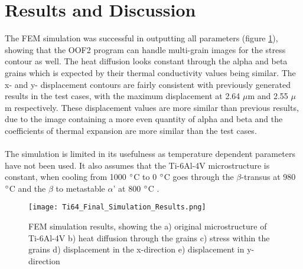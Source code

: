 \documentclass[report.tex]{subfiles}
\begin{document}
\section{Results and Discussion}

The FEM simulation was successful in outputting all parameters (figure \ref{fig:FinalSimulationResults}), showing that the OOF2 program can handle multi-grain images for the stress contour as well. The heat diffusion looks constant through the alpha and beta grains which is expected by their thermal conductivity values being similar. The x- and y- displacement contours are fairly consistent with previously generated results in the test cases, with the maximum displacement at 2.64 $\mu$m and 2.55 $\mu$m respectively. These displacement values are more similar than previous results, due to the image containing a more even quantity of alpha and beta and the coefficients of thermal expansion are more similar than the test cases.\\
\\
The simulation is limited in its usefulness as temperature dependent parameters have not been used. It also assumes that the Ti-6Al-4V microstructure is constant, when cooling from 1000 $\degree$C to 0 $\degree$C goes through the $\beta$-transus at 980 $\degree$C and the $\beta$ to metastable $\alpha$' at 800 $\degree$C \cite{Ti64PhaseDiagram}.

\begin{figure}[h!]
    \centering
    \texttt{[image: Ti64\_Final\_Simulation\_Results.png]}
    \caption{FEM simulation results, showing the a) original microstructure of Ti-6Al-4V b) heat diffusion through the grains c) stress    within the grains d) displacement in the x-direction e) displacement in y-direction}
    \label{fig:FinalSimulationResults}
\end{figure}
\end{document}
